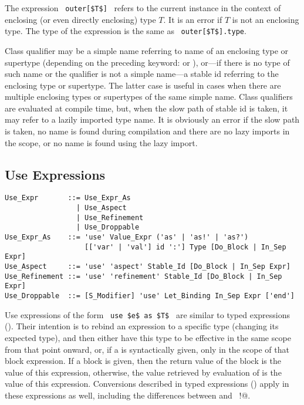 The expression ~\lstinline!outer[$T$]!~ refers to the current instance in the context of enclosing (or even directly enclosing) type $T$. It is an error if $T$ is not an enclosing type. The type of the expression is the same as ~\lstinline!outer[$T$].type!. 

Class qualifier may be a simple name referring to name of an enclosing type or supertype (depending on the preceding keyword:  or ), or---if there is no type of such name or the qualifier is not a simple name---a stable id referring to the enclosing type or supertype. The latter case is useful in cases when there are multiple enclosing types or supertypes of the same simple name. Class qualifiers are evaluated at compile time, but, when the slow path of stable id is taken, it may refer to a lazily imported type name. It is obviously an error if the slow path is taken, no name is found during compilation and there are no lazy imports in the scope, or no name is found using the lazy import. 





\subsection{Use Expressions}
\label{sec:use-expressions}

\syntax\begin{lstlisting}
Use_Expr       ::= Use_Expr_As 
                 | Use_Aspect
                 | Use_Refinement
                 | Use_Droppable
Use_Expr_As    ::= 'use' Value_Expr ('as' | 'as!' | 'as?')
                   [['var' | 'val'] id ':'] Type [Do_Block | In_Sep Expr]
Use_Aspect     ::= 'use' 'aspect' Stable_Id [Do_Block | In_Sep Expr]
Use_Refinement ::= 'use' 'refinement' Stable_Id [Do_Block | In_Sep Expr]
Use_Droppable  ::= [S_Modifier] 'use' Let_Binding In_Sep Expr ['end']
\end{lstlisting}

Use expressions of the form ~\lstinline!use $e$ as $T$!~ are similar to typed expressions (). Their intention is to rebind an expression to a specific type (changing its expected type), and then either have this type to be effective in the same scope from that point onward, or, if a  is syntactically given, only in the scope of that block expression. If a block is given, then the return value of the block is the value of this expression, otherwise, the value retrieved by evaluation of  is the value of this expression. Conversions described in typed expressions () apply in these expressions as well, including the differences between  and ~\lstinline@as!@. 

